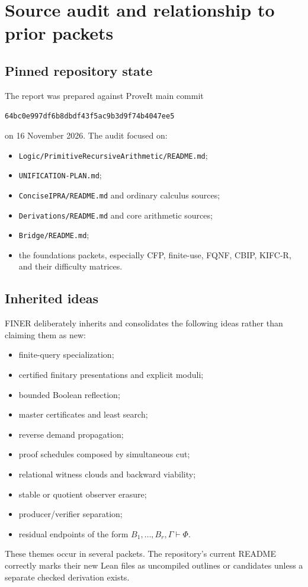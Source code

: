 \section{Source audit and relationship to prior packets}
\label{app:audit}

\subsection{Pinned repository state}

The report was prepared against ProveIt main commit
\begin{center}
\texttt{64bc0e997df6b8dbdf43f5ac9b3d9f74b4047ee5}
\end{center}
on 16 November 2026.  The audit focused on:
\begin{itemize}[leftmargin=2em]
\item \texttt{Logic/PrimitiveRecursiveArithmetic/README.md};
\item \texttt{UNIFICATION-PLAN.md};
\item \texttt{ConciseIPRA/README.md} and ordinary calculus sources;
\item \texttt{Derivations/README.md} and core arithmetic sources;
\item \texttt{Bridge/README.md};
\item the foundations packets, especially CFP, finite-use, FQNF, CBIP, KIFC-R, and their difficulty matrices.
\end{itemize}

\subsection{Inherited ideas}

FINER deliberately inherits and consolidates the following ideas rather than claiming them as new:
\begin{itemize}[leftmargin=2em]
\item finite-query specialization;
\item certified finitary presentations and explicit moduli;
\item bounded Boolean reflection;
\item master certificates and least search;
\item reverse demand propagation;
\item proof schedules composed by simultaneous cut;
\item relational witness clouds and backward viability;
\item stable or quotient observer erasure;
\item producer/verifier separation;
\item residual endpoints of the form \(B_1,\ldots,B_r,\Gamma\vdash\Phi\).
\end{itemize}
These themes occur in several packets.  The repository's current README correctly marks their new Lean files as uncompiled outlines or candidates unless a separate checked derivation exists.


